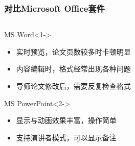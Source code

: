 \begin{frame}
    \frametitle{对比Microsoft Office套件}
    \begin{columns}
        \begin{column}{0.94\textwidth}
            \begin{block}{MS Word}<1->
                \begin{itemize}
                    \item 实时预览，论文页数较多时卡顿明显
                    \item 内容编辑时，格式经常出现各种问题
                    \item 导师论文修改后，需要反复检查格式
                \end{itemize}
            \end{block}
            \begin{block}{MS PowerPoint}<2->
                \begin{itemize}
                    \item 显示与动画效果丰富，操作简单
                    \item 支持演讲者模式，可以显示备注
                \end{itemize}
            \end{block}
        \end{column}
        \begin{column}{0.06\textwidth}
        \end{column}
    \end{columns}
\end{frame}
